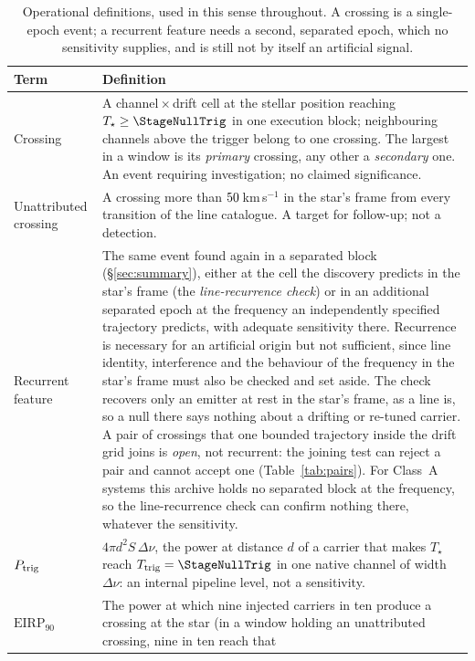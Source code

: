 \begin{table}
\centering
\caption{Operational definitions, used in this sense throughout. A crossing is
a single-epoch event; a recurrent feature needs a second, separated epoch,
which no sensitivity supplies, and is still not by itself an artificial
signal.}
\label{tab:quantities}
\small
\begin{tabular}{@{}p{}p{}@{}}
\hline
Term & Definition \\
\hline
Crossing &
A channel\,$\times$\,drift cell at the stellar position reaching
$T_\star\geq\StageNullTrig$ in one execution block; neighbouring channels
above the trigger belong to one crossing. The largest in a window is its
\emph{primary} crossing, any other a \emph{secondary} one. An event requiring
investigation; no claimed significance. \\
Unattributed crossing &
A crossing more than $50$\,km\,s$^{-1}$ in the star's frame from
every transition of the line catalogue. A target for follow-up; not a
detection. \\
Recurrent feature &
The same event found again in a separated block (\S\ref{sec:summary}),
either at the cell the discovery predicts in the star's frame (the
\emph{line-recurrence check}) or in an additional separated epoch at the
frequency an independently specified trajectory predicts, with adequate
sensitivity there. Recurrence is necessary for an artificial origin but not
sufficient, since line identity, interference and the behaviour of the
frequency in the star's frame must also be checked and set aside. The check recovers only an emitter at rest in the star's
frame, as a line is, so a null there says nothing about a drifting or
re-tuned carrier. A pair of crossings that one bounded trajectory inside the drift
grid joins is \emph{open}, not recurrent: the joining test can reject a pair
and cannot accept one (Table~\ref{tab:pairs}). For \ZcNoRepSys{} Class~A
systems this archive holds no separated block at the frequency, so the
line-recurrence check can confirm nothing there, whatever the sensitivity. \\
$P_{\rm trig}$ &
$4\pi d^{2}S\,\Delta\nu$, the power at distance $d$ of a carrier that makes
$T_\star$ reach $T_{\rm trig}=\StageNullTrig$ in one native channel of width
$\Delta\nu$: an internal pipeline level, not a sensitivity. \\
$\mathrm{EIRP}_{90}$ &
The power at which nine injected carriers in ten produce a crossing at the
star (in a window holding an unattributed crossing, nine in ten reach that

\end{tabular}
\end{table}
